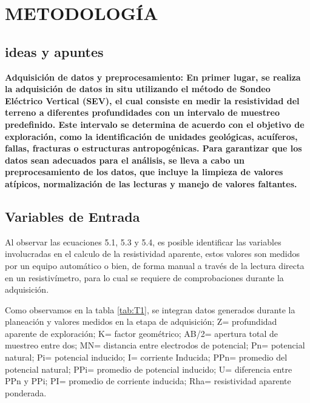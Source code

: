 \chapter{METODOLOGÍA}

\section{ideas y apuntes}


\textbf{Adquisición de datos y preprocesamiento: En primer lugar, se realiza la adquisición de datos in situ utilizando el método de Sondeo Eléctrico Vertical (SEV), el cual consiste en medir la resistividad del terreno a diferentes profundidades con un intervalo de muestreo predefinido. Este intervalo se determina de acuerdo con el objetivo de exploración, como la identificación de unidades geológicas, acuíferos, fallas, fracturas o estructuras antropogénicas. Para garantizar que los datos sean adecuados para el análisis, se lleva a cabo un preprocesamiento de los datos, que incluye la limpieza de valores atípicos, normalización de las lecturas y manejo de valores faltantes.}


\section{Variables de Entrada}
	Al observar las ecuaciones 5.1, 5.3 y 5.4, es posible identificar las variables involucradas en el calculo de la resistividad aparente, estos valores son medidos por un equipo automático o bien, de forma manual a través de la lectura directa en un resistivímetro, para lo cual se requiere de comprobaciones durante la adquisición.
		
	Como observamos en la tabla \ref{tab:T1}, se integran datos generados durante la planeación y valores medidos en la etapa de adquisición; Z= profundidad aparente de exploración; K= factor geométrico; AB/2= apertura total de muestreo entre dos; MN= distancia entre electrodos de potencial; Pn= potencial natural; Pi= potencial inducido; I= corriente Inducida; PPn= promedio del potencial natural; PPi= promedio de potencial inducido; U= diferencia entre PPn y PPi; PI= promedio de corriente inducida; Rha= resistividad aparente ponderada.
	
